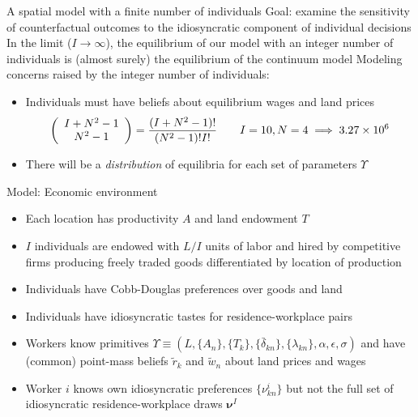 \documentclass[11pt,notes=hide,aspectratio=169]{beamer}
\begin{document}
\begin{frame}{A spatial model with a finite number of individuals}
Goal: examine the sensitivity of counterfactual outcomes to the idiosyncratic component of individual decisions
In the limit ($I\to\infty$), the equilibrium of our model with an integer number of individuals
is (almost surely) the equilibrium of the continuum model
Modeling concerns raised by the integer number of individuals:
\begin{itemize}
\item Individuals must have beliefs about equilibrium wages and land prices 
$$
\textcolor{gray}{
\left(\begin{array}{c}I + N^2 -1 \\ N^2 - 1 \end{array}\right) =  \frac{(I + N^2 -1)!}{(N^2 - 1)!I!}
\qquad 
I=10,N=4
\implies
3.27 \times 10^{6}
}
$$
\item There will be a \textit{distribution} of equilibria for each set of parameters $\Upsilon$
\end{itemize}
\end{frame}
\begin{frame}{Model: Economic environment}
\begin{itemize}
\item
Each location has productivity $A$ and land endowment $T$
\item
$I$ individuals are endowed with 
$L/I$ units of labor
and hired by 
competitive firms producing freely traded goods differentiated by location of production
\pause
\item
Individuals have Cobb-Douglas preferences over goods and land
\item
Individuals have idiosyncratic tastes for residence-workplace pairs
\item Workers know primitives $\Upsilon \equiv  (L,\{A_n\},\{T_k\},\{\bar{\delta}_{kn}\}, \{\lambda_{kn}\} ,\alpha , \epsilon , \sigma)$
and have 
(common) point-mass beliefs $\tilde{r}_k$ and $\tilde{w}_n$ about land prices and wages
\item Worker $i$ knows own idiosyncratic preferences $\{\nu_{kn}^{i}\}$ but not the full set of  idiosyncratic residence-workplace draws $\boldsymbol \nu^{I}$
\end{itemize}
\end{frame}
\end{document}
